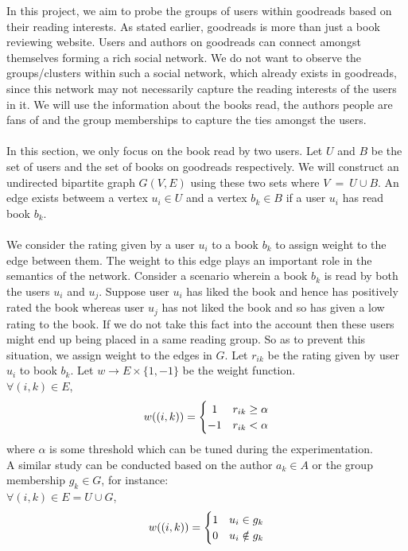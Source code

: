 \documentclass[11pt]{article}
\begin{document}
In this project, we aim to probe the groups of users within goodreads based on their reading interests. As stated earlier, goodreads is more than just a book reviewing website. Users and authors on goodreads can connect amongst themselves forming a rich social network. We do not want to observe the groups/clusters within such a social network, which already exists in goodreads, since this network may not necessarily capture the reading interests of the users in it. We will use the information about the books read, the authors people are fans of and the group memberships to capture the ties amongst the users. \\\\

In this section, we only focus on the book read by two users. Let $U$ and $B$ be the set of users and the set of books on goodreads respectively. We will construct an undirected bipartite graph $G(V, E)$ using these two sets where $V ~=~ U \cup B$. An edge exists betweem a vertex $u_i \in U$ and a vertex $b_k \in B$ if a user $u_i$ has read book $b_k$.\\\\
We consider the rating given by a user $u_i$ to a book $b_k$ to assign weight to the edge between them. The weight to this edge plays an important role in the semantics of the network. Consider a scenario wherein a book $b_k$ is read by both the users $u_i$ and $u_j$. Suppose user $u_i$ has liked the book and hence has positively rated the book whereas user $u_j$ has not liked the book and so has given a low rating to the book. If we do not take this fact into the account then these users might end up being placed in a same reading group. So as to prevent this situation, we assign weight to the edges in $G$. Let $r_{ik}$ be the rating given by user $u_i$ to book $b_k$. Let $w \rightarrow E \times \{1, -1\}$ be the weight function.\\
$\forall (i, k) \in E$, 
\[
	w((i, k)) = \left\{\def\arraystretch{1.2}%
		\begin{array}{@{}c@{\quad}l@{}}
		1 & r_{ik} \geq \alpha\\
		-1 & r_{ik} < \alpha\\
		\end{array}\right.
\]
where $\alpha$ is some threshold which can be tuned during the experimentation.\\
A similar study can be conducted based on the author $a_k \in A$ or the group membership $g_k \in G$, for instance:\\
$\forall (i, k) \in E=U \cup G$, 
\[
	w((i, k)) = \left\{\def\arraystretch{1.2}%
		\begin{array}{@{}c@{\quad}l@{}}
		1 & u_i \in g_k\\
		0 & u_i \notin g_k\\
		\end{array}\right.
\]
\\\\
\end{document}
